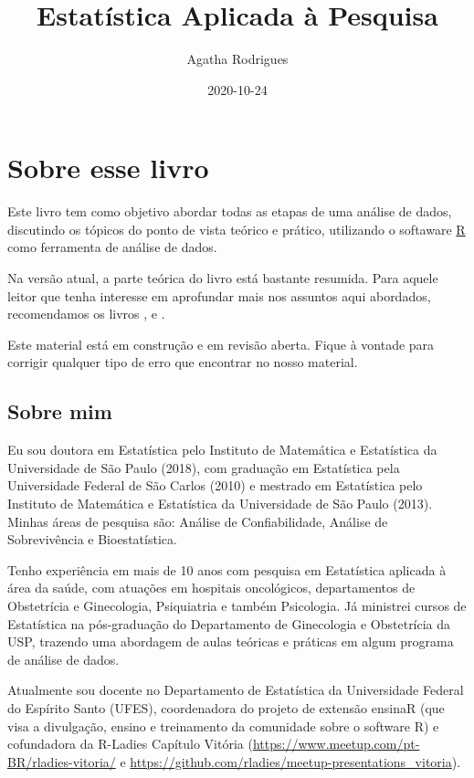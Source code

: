 \documentclass[
]{book}
\title{Estatística Aplicada à Pesquisa}
\author{Agatha Rodrigues}
\date{2020-10-24}
\begin{document}
\maketitle

{
\setcounter{tocdepth}{1}
\tableofcontents
}
\hypertarget{sobre-esse-livro}{%
\chapter{Sobre esse livro}\label{sobre-esse-livro}}

Este livro tem como objetivo abordar todas as etapas de uma análise de dados, discutindo os tópicos do ponto de vista teórico e prático, utilizando o softaware \href{https://cran.r-project.org/}{R} como ferramenta de análise de dados.

Na versão atual, a parte teórica do livro está bastante resumida. Para aquele leitor que tenha interesse em aprofundar mais nos assuntos aqui abordados, recomendamos os livros \citep{morettin2020introduccaoa}, \citep{bussab2004estatistica} e \citep{magalhaes2002noccoes}.

Este material está em construção e em revisão aberta. Fique à vontade para corrigir qualquer tipo de erro que encontrar no nosso material.

\hypertarget{sobre-mim}{%
\section{Sobre mim}\label{sobre-mim}}

Eu sou doutora em Estatística pelo Instituto de Matemática e Estatística da Universidade de São Paulo (2018), com graduação em Estatística pela Universidade Federal de São Carlos (2010) e mestrado em Estatística pelo Instituto de Matemática e Estatística da Universidade de São Paulo (2013). Minhas áreas de pesquisa são: Análise de Confiabilidade, Análise de Sobrevivência e Bioestatística.

Tenho experiência em mais de 10 anos com pesquisa em Estatística aplicada à área da saúde, com atuações em hospitais oncológicos, departamentos de Obstetrícia e Ginecologia, Psiquiatria e também Psicologia. Já ministrei cursos de Estatística na pós-graduação do Departamento de Ginecologia e Obstetrícia da USP, trazendo uma abordagem de aulas teóricas e práticas em algum programa de análise de dados.

Atualmente sou docente no Departamento de Estatística da Universidade Federal do Espírito Santo (UFES), coordenadora do projeto de extensão ensinaR (que visa a divulgação, ensino e treinamento da comunidade sobre o software R) e cofundadora da R-Ladies Capítulo Vitória (\url{https://www.meetup.com/pt-BR/rladies-vitoria/} e \url{https://github.com/rladies/meetup-presentations_vitoria}).
\end{document}
